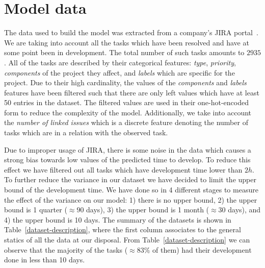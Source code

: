 \documentclass[conference,compsoc]{IEEEtran}
\begin{document}


\section{Model data}
The data used to build the model was extracted from a company's JIRA portal~\cite{JIRA}. We are taking into account all the tasks which have been resolved and have at some point been in development. The total number of such tasks amounts to $2935$. All of the tasks are described by their categorical features: \textit{type}, \textit{priority}, \textit{components} of the project they affect, and \textit{labels} which are specific for the project. Due to their high cardinality, the values of the \textit{components} and \textit{labels} features have been filtered such that there are only left values which have at least 50 entries in the dataset. The filtered values are used in their one-hot-encoded form to reduce the complexity of the model. Additionally, we take into account the \textit{number of linked issues} which is a discrete feature denoting the number of tasks which are in a relation with the observed task.

Due to improper usage of JIRA, there is some noise in the data which causes a strong bias towards low values of the predicted time to develop. To reduce this effect we have filtered out all tasks which have development time lower than $2h$. To further reduce the variance in our dataset we have decided to limit the upper bound of the development time. We have done so in 4 different stages to measure the effect of the variance on our model: 1) there is no upper bound, 2) the upper bound is 1 quarter ($\approx 90$ days), 3) the upper bound is 1 month ($\approx 30$ days), and 4) the upper bound is 10 days. The summary of the datasets is shown in Table~\ref{dataset-description}, where the first column associates to the general statics of all the data at our disposal. From Table~\ref{dataset-description} we can observe that the majority of the tasks ($\approx 83\%$ of them) had their development done in less than 10 days.
\end{document}
